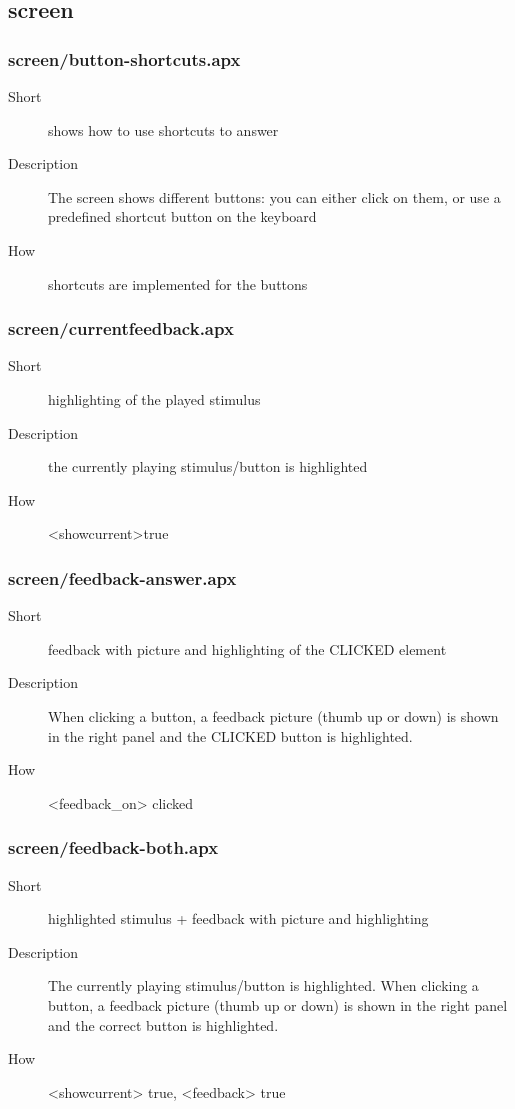 \subsection{screen}
\subsubsection{screen/button-shortcuts.apx}
\begin{description}
\item[Short] 
 shows how to use shortcuts to answer
\item[Description] 
 The screen shows different buttons: you can either click on them, or use a predefined shortcut button on the keyboard
\item[How] 
 shortcuts are implemented for the buttons
\end{description}

\subsubsection{screen/currentfeedback.apx}
\begin{description}
\item[Short] 
 highlighting of the played stimulus
\item[Description] 
 the currently playing stimulus/button is highlighted
\item[How] 
 \textless{}showcurrent\textgreater{}true
\end{description}

\subsubsection{screen/feedback-answer.apx}
\begin{description}
\item[Short] 
 feedback with picture and highlighting  of the CLICKED element
\item[Description] 
 When clicking a button, a feedback picture (thumb up or down) is shown in the right panel and the CLICKED button is highlighted.
\item[How] 
 \textless{}feedback\_on\textgreater{} clicked
\end{description}

\subsubsection{screen/feedback-both.apx}
\begin{description}
\item[Short] 
 highlighted stimulus + feedback with picture and highlighting
\item[Description] 
 The currently playing stimulus/button is highlighted. When clicking a button, a feedback picture (thumb up or down) is shown in the right panel and the correct button is highlighted.
\item[How] 
 \textless{}showcurrent\textgreater{} true, \textless{}feedback\textgreater{} true
\end{description}

